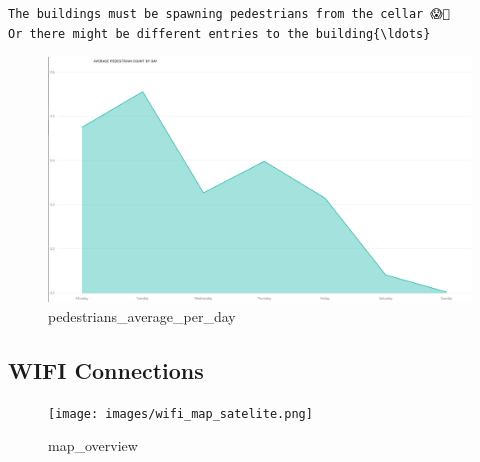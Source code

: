 \documentclass[11pt]{article}
\makeatletter
\def\maxwidth{\ifdim\Gin@nat@width>\linewidth\linewidth
    \else\Gin@nat@width\fi}
\let\Oldincludegraphics\includegraphics
\renewcommand{\includegraphics}[1]{\Oldincludegraphics[width=.8\maxwidth]{#1}}
\makeatother
\begin{document}
    \begin{Verbatim}[commandchars=\\\{\}]
The buildings must be spawning pedestrians from the cellar 😱🧙
Or there might be different entries to the building{\ldots}

    \end{Verbatim}

    \begin{figure}
\centering
\includegraphics{images/pedestrains_average_count_by_day.png}
\caption{pedestrians\_average\_per\_day}
\end{figure}

    \subsection{WIFI Connections}\label{wifi-connections}

\begin{figure}
\centering
\texttt{[image: images/wifi\_map\_satelite.png]}
\caption{map\_overview}
\end{figure}
\end{document}
